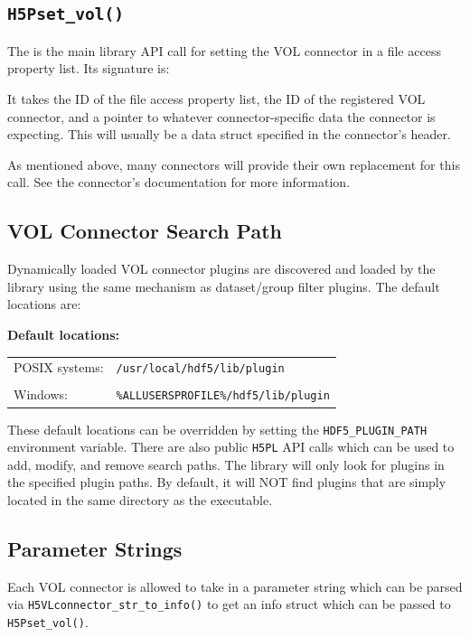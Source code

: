 \subsection{\tt H5Pset\_vol()}

The is the main library API call for setting the VOL connector in a file access property list. Its signature is:

\quad{}

It takes the ID of the file access property list, the ID of the registered VOL connector, and a pointer to whatever connector-specific data the connector is expecting. This will usually be a data struct specified in the connector's header.

As mentioned above, many connectors will provide their own replacement for this call. See the connector's documentation for more information.

\subsection{VOL Connector Search Path}

Dynamically loaded VOL connector plugins are discovered and loaded by the library using the same mechanism as dataset/group filter plugins. The default locations are:

\textbf{Default locations:}

\begin{tabular}{ l l }
    POSIX systems: &  {\tt /usr/local/hdf5/lib/plugin} \\
     & \\
    Windows: & {\tt \%ALLUSERSPROFILE\%/hdf5/lib/plugin}
\end{tabular}

These default locations can be overridden by setting the {\tt HDF5\_PLUGIN\_PATH} environment variable. There are also public {\tt H5PL} API calls which can be used to add, modify, and remove search paths. The library will only look for plugins in the specified plugin paths. By default, it will NOT find plugins that are simply located in the same directory as the executable.

\subsection{Parameter Strings}

Each VOL connector is allowed to take in a parameter string which can be parsed via {\tt H5VLconnector\_str\_to\_info()} to get an info struct which can be passed to {\tt H5Pset\_vol()}.

